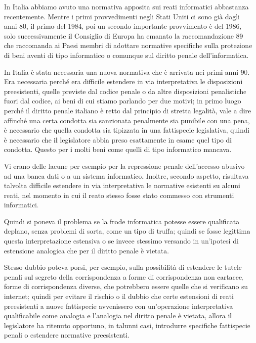 In Italia abbiamo avuto una normativa apposita sui reati informatici abbastanza recentemente. Mentre i primi provvedimenti negli Stati Uniti ci sono già dagli anni 80, il primo del 1984, poi un secondo importante provvimento è del 1986, solo successivamente il Consiglio di Europa ha emanato la raccomandazione 89 che raccomanda ai Paesi membri di adottare normative specifiche sulla protezione di beni aventi di tipo informatico o comunque sul diritto penale dell'informatica. 

In Italia è stata necessaria una nuova normativa che è arrivata nei primi anni 90. Era necessaria perché era difficile estendere in via interpretativa le disposizioni preesistenti, quelle previste dal codice penale o da altre disposizioni penalistiche fuori dal codice, ai beni di cui stiamo parlando per due motivi; in primo luogo perché il diritto penale italiano è retto dal principio di stretta legalità, vale a dire affinché una certa condotta sia sanzionata penalmente sia punibile con una pena, è necessario che quella condotta sia tipizzata in una fattispecie legislativa, quindi è necessario che il legislatore abbia preso esattamente in esame quel tipo di condotta. Questo per i molti beni come quelli di tipo informatico mancava. 

Vi erano delle lacune per esempio per la repressione penale dell'accesso abusivo ad una banca dati o a un sistema informatico. Inoltre, secondo aspetto, risultava talvolta difficile estendere in via interpretativa le normative esistenti su alcuni reati, nel momento in cui il reato stesso fosse stato commesso con strumenti informatici. 

Quindi si poneva il problema se la frode informatica potesse essere qualificata deplano, senza problemi di sorta, come un tipo di truffa; quindi se fosse legittima questa interpretazione estensiva o se invece stessimo versando in un'ipotesi di estensione analogica che per il diritto penale è vietata. 

Stesso dubbio poteva porsi, per esempio, sulla possibilità di estendere le tutele penali sul segreto della corrispondenza a forme di corrispondenza non cartacee, forme di corrispondenza diverse, che potrebbero essere quelle che si verificano su internet; quindi per evitare il rischio o il dubbio che certe estensioni di reati preesistenti a nuove fattispecie avvenissero con un'operazione interpretativa qualificabile come analogia e l'analogia nel diritto penale è vietata, allora il legislatore ha ritenuto opportuno, in talunni casi, introdurre specifiche fattispecie penali o estendere normative preesistenti. 

